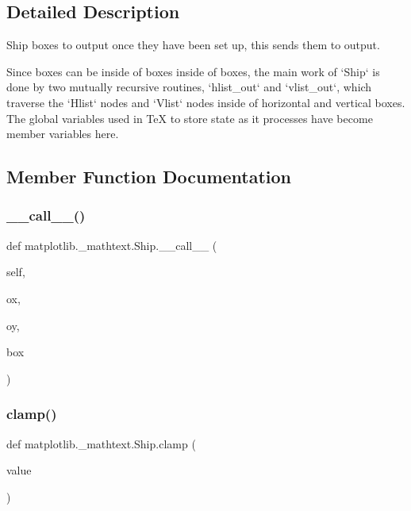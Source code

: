 \subsection{Detailed Description}
\begin{DoxyVerb}Ship boxes to output once they have been set up, this sends them to output.

Since boxes can be inside of boxes inside of boxes, the main work of `Ship`
is done by two mutually recursive routines, `hlist_out` and `vlist_out`,
which traverse the `Hlist` nodes and `Vlist` nodes inside of horizontal
and vertical boxes.  The global variables used in TeX to store state as it
processes have become member variables here.
\end{DoxyVerb}
 

\subsection{Member Function Documentation}
\mbox{\label{classmatplotlib_1_1__mathtext_1_1Ship_add689aa1829478359ac56e36493db01a}} 
\subsubsection{\texorpdfstring{\+\_\+\+\_\+call\+\_\+\+\_\+()}{\_\_call\_\_()}}
{\footnotesize\ttfamily def matplotlib.\+\_\+mathtext.\+Ship.\+\_\+\+\_\+call\+\_\+\+\_\+ (\begin{DoxyParamCaption}\item[{}]{self,  }\item[{}]{ox,  }\item[{}]{oy,  }\item[{}]{box }\end{DoxyParamCaption})}

\mbox{\label{classmatplotlib_1_1__mathtext_1_1Ship_a53454355065ac2443cf24429e8753390}} 
\subsubsection{\texorpdfstring{clamp()}{clamp()}}
{\footnotesize\ttfamily def matplotlib.\+\_\+mathtext.\+Ship.\+clamp (\begin{DoxyParamCaption}\item[{}]{value }\end{DoxyParamCaption})\hspace{0.3cm}{\ttfamily [static]}}

